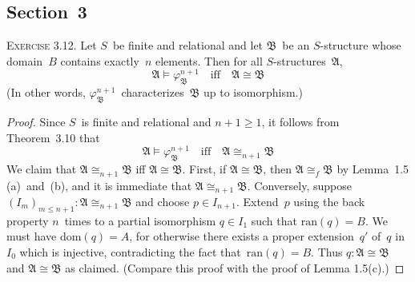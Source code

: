 \documentclass[letterpaper]{article}
\newcommand{\iso}{\cong}
\newcommand{\A}{\mathfrak{A}}
\newcommand{\B}{\mathfrak{B}}
\newcommand{\fiso}{\iso_f}
\newcommand{\dom}{\mathrm{dom}}
\newcommand{\ran}{\mathrm{ran}}
\theoremstyle{remark}
\begin{document}
\subsection*{Section~3}
\noindent\textsc{Exercise 3.12.}
Let $S$~be finite and relational and let $\B$~be an $S$-structure whose domain~$B$ contains exactly~$n$ elements. Then for all $S$-structures~$\A$,
$$\A\models\varphi_{\B}^{n+1}\quad\text{iff}\quad\A\iso\B$$
(In other words, $\varphi_{\B}^{n+1}$~characterizes~$\B$ up to isomorphism.)
\begin{proof}
Since $S$~is finite and relational and $n+1\ge1$, it follows from Theorem~3.10 that
$$\A\models\varphi_{\B}^{n+1}\quad\text{iff}\quad\A\iso_{n+1}\B$$
We claim that $\A\iso_{n+1}\B$ iff $\A\iso\B$. First, if $\A\iso\B$, then $\A\fiso\B$ by Lemma~1.5 (a)~and~(b), and it is immediate that $\A\iso_{n+1}\B$. Conversely, suppose $(I_m)_{m\le n+1}:\A\iso_{n+1}\B$ and choose $p\in I_{n+1}$. Extend~$p$ using the back property $n$~times to a partial isomorphism $q\in I_1$ such that $\ran(q)=B$. We must have $\dom(q)=A$, for otherwise there exists a proper extension~$q'$ of~$q$ in~$I_0$ which is injective, contradicting the fact that~$\ran(q)=B$. Thus $q:\A\iso\B$ and $\A\iso\B$ as claimed. (Compare this proof with the proof of Lemma 1.5(c).)
\end{proof}
\end{document}
